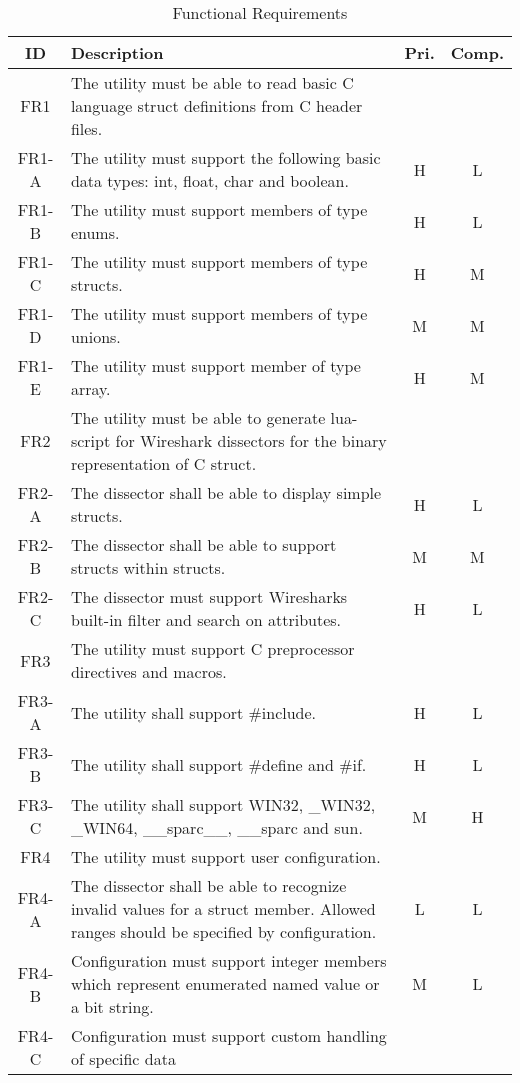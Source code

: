 \begin{table}[ht] \small \center
\caption{Functional Requirements\label{tab:funcreq}}
\begin{tabular}{c | p{9cm} | c  c }
	ID & Description & Pri. & Comp. \\ \hline \hline
	FR1 & The utility must be able to read basic C language
		struct definitions from C header files.
		& & \\
	FR1-A & The utility must support the following basic data types:
		int, float, char and boolean.
		& H & L \\
	FR1-B & The utility must support members of type enums.
		& H & L \\
	FR1-C & The utility must support members of type structs.
		& H & M \\
	FR1-D & The utility must support members of type unions.
		& M & M \\
	FR1-E & The utility must support member of type array.
		& H & M \\ \hline
	FR2 & The utility must be able to generate lua-script for Wireshark
		dissectors for the binary representation of C struct.
		& & \\
	FR2-A & The dissector shall be able to display simple structs.
		& H & L \\
	FR2-B & The dissector shall be able to support structs within
		structs.
		& M & M \\
	FR2-C & The dissector must support Wiresharks built-in filter and
		search on attributes.
		& H & L \\ \hline
	FR3 & The utility must support C preprocessor directives and macros.
		& & \\
	FR3-A & The utility shall support \#include.
		& H & L \\
	FR3-B & The utility shall support \#define and \#if.
		& H & L \\
	FR3-C & The utility shall support WIN32, \_WIN32, \_WIN64,
		\_\_sparc\_\_, \_\_sparc and sun.
		& M & H \\ \hline
	FR4 & The utility must support user configuration.
		& & \\
	FR4-A & The dissector shall be able to recognize invalid values for
		a struct member. Allowed ranges should be specified by configuration.
		& L & L \\
	FR4-B & Configuration must support integer members which represent
		enumerated named value or a bit string.
		& M & L \\
	FR4-C & Configuration must support custom handling of specific data

\end{tabular}
\end{table}
